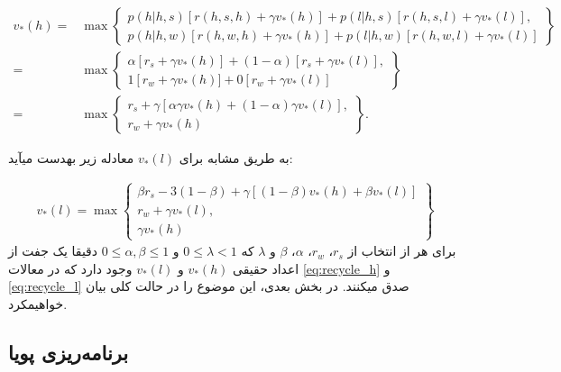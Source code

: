\begin{align}
v_*(h) =& \max \left\{ 
\begin{array}{lr}
   p(h|h,s) \left[ r(h,s,h)+ \gamma v_*(h) \right] + p(l|h,s) \left[ r(h,s,l)+\gamma v_*(l) \right], \\ 
   p(h|h,w)[r(h,w,h)+ \gamma v_*(h)]+p(l|h,w)[r(h,w,l)+\gamma v_*(l)]
\end{array}
\right\} \nonumber \\
 =& \max \left\{ 
\begin{array}{lr}
   \alpha \left[ r_s+ \gamma v_*(h) \right] + (1 - \alpha) \left[ r_s+\gamma v_*(l) \right], \\ 
   1 \left[ r_w + \gamma v_*(h)]+ 0[r_w + \gamma v_*(l)]
\end{array}
\right\} \\
 =& \max \left\{ 
\begin{array}{lr}
   r_s + \gamma \left[  \alpha \gamma v_*(h) + (1 - \alpha) \gamma v_*(l) \right], \\ 
   r_w + \gamma v_* (h)
\end{array}
\right\}.
\label{eq:recycle_h}
\end{align}


به طریق مشابه برای 
$v_*(l)$
معادله زیر به\nf دست می\nf آید:


\begin{align}
	v_*(l) = \max \left \{ 
	\begin{array}{lr}
		\beta r_s - 3(1-\beta) + \gamma \left[ (1-\beta) v_*(h)+\beta v_*(l)\right] \\
		r_w + \gamma v_*(l), \\
		\gamma v_*(h)
	\end{array}
	\right \}
	\label{eq:recycle_l}
\end{align}
برای هر از انتخاب از 
$r_s$،
$r_w$،
$\alpha$،
$\beta$
و $\lambda$ که 
$0 \le \lambda < 1$
و
$0 \le \alpha,\beta \le 1$
دقیقا یک جفت از اعداد حقیقی 
$v_*(h)$
و 
$v_*(l)$
وجود دارد که در معالات
\ref{eq:recycle_h}
و
\ref{eq:recycle_l}
 صدق می\nf کنند. در بخش بعدی، این موضوع را در حالت کلی بیان خواهیم\nf کرد.




\subsection{برنامه‌ریزی پویا}

